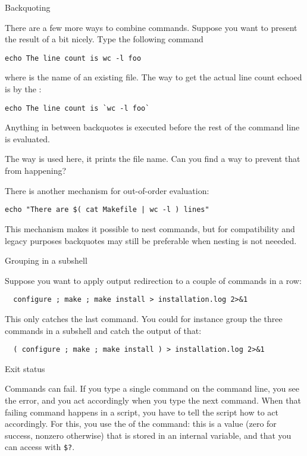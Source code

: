  {Backquoting}
\label{tut:unix-backquote}

There are a few more ways to combine commands. Suppose you want to
present the result of  a bit nicely. Type the following command
\begin{verbatim}
echo The line count is wc -l foo
\end{verbatim}
where  is the name of an existing file. The way to
get the actual line count echoed is by the :
\begin{verbatim}
echo The line count is `wc -l foo`
\end{verbatim}
Anything in between backquotes is executed before the rest of the
command line is evaluated.

\begin{exercise}
  The way  is used here, it prints the
  file name. Can you find a way to prevent that from happening?
\end{exercise}

There is another mechanism for
out-of-order evaluation:
\begin{verbatim}
echo "There are $( cat Makefile | wc -l ) lines"
\end{verbatim}
This mechanism makes it possible to nest commands,
but for compatibility and legacy purposes backquotes
may still be preferable when nesting is not neeeded.

 {Grouping in a subshell}

Suppose you want to apply output redirection to a couple of commands
in a row:
\begin{verbatim}
  configure ; make ; make install > installation.log 2>&1
\end{verbatim}
This only catches the last command. You could for instance group the
three commands in a subshell and catch the output of that:
\begin{verbatim}
  ( configure ; make ; make install ) > installation.log 2>&1
\end{verbatim}

 {Exit status}

Commands can fail. If you type a single command on the command line,
you see the error, and you act accordingly when you type the next
command. When that failing command happens in a script, you have to
tell the script how to act accordingly. For this, you use the
 of the command: this is a value (zero for
success, nonzero otherwise) that is stored in an internal variable,
and that you can access with \verb+$?+.

